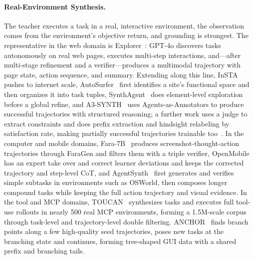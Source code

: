 \paragraph{Real-Environment Synthesis.} The teacher executes a task in a real, interactive environment, the observation comes from the environment's objective return, and grounding is strongest. The representative in the web domain is Explorer~\cite{Pah25}: GPT-4o discovers tasks autonomously on real web pages, executes multi-step interactions, and---after multi-stage refinement and a verifier---produces a multimodal trajectory with page state, action sequence, and summary. Extending along this line, InSTA~\cite{Tra25} pushes to internet scale, AutoSurfer~\cite{Fai26} first identifies a site's functional space and then organizes it into task tuples, SynthAgent~\cite{Wan25ar} does element-level exploration before a global refine, and A3-SYNTH~\cite{Lu26} uses Agents-as-Annotators to produce successful trajectories with structured reasoning; a further work uses a judge to extract constraints and does prefix extraction and hindsight relabeling by satisfaction rate, making partially successful trajectories trainable too~\cite{Log26b}. In the computer and mobile domains, Fara-7B~\cite{Awa25} produces screenshot-thought-action trajectories through FaraGen and filters them with a triple verifier, OpenMobile~\cite{Che26d} has an expert take over and correct learner deviations and keeps the corrected trajectory and step-level CoT, and AgentSynth~\cite{Xie25e} first generates and verifies simple subtasks in environments such as OSWorld, then composes longer compound tasks while keeping the full action trajectory and visual evidence. In the tool and MCP domains, TOUCAN~\cite{Xu25o} synthesizes tasks and executes full tool-use rollouts in nearly 500 real MCP environments, forming a 1.5M-scale corpus through task-level and trajectory-level double filtering. ANCHOR~\cite{Wei26b} finds branch points along a few high-quality seed trajectories, poses new tasks at the branching state and continues, forming tree-shaped GUI data with a shared prefix and branching tails.

